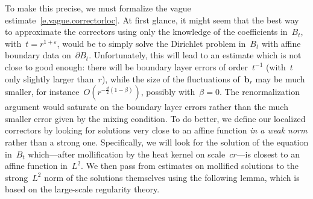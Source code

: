\documentclass[11pt,twoside]{article} %
\numberwithin{equation}{section}
\theoremstyle{definition}
\newcommand{\eps}{\varepsilon}
\renewcommand{\b}{\ensuremath{\mathbf{b}}}
\newcommand{\ep}{\eps}
\begin{document}
\smallskip

To make this precise, we must formalize the vague estimate~\eqref{e.vague.correctorloc}.
At first glance, it might seem that the best way to approximate the correctors using only the knowledge of the coefficients in~$B_t$, with~$t = r^{1+\ep}$, would be to simply solve the Dirichlet problem in~$B_t$ with affine boundary data on~$\partial B_t$. Unfortunately, this will lead to an estimate which is not close to good enough: there will be boundary layer errors of order~$t^{-1}$ (with~$t$ only slightly larger than~$r$), while the size of the fluctuations of~$\b_r$ may be much smaller, for instance~$O(r^{-\frac d2(1-\beta)})$, possibly with~$\beta=0$. The renormalization argument would saturate on the boundary layer errors rather than the much smaller error given by the mixing condition. To do better, we define our localized correctors by looking for solutions very close to an affine function \emph{in a weak norm} rather than a strong one. 
Specifically, we will look for the solution of the equation in~$B_t$ which---after mollification by the heat kernel on scale~$cr$---is closest to an affine function in~$L^2$. We then pass from estimates on mollified solutions to the strong~$L^2$ norm of the solutions themselves using the following lemma, which is based on the large-scale regularity theory. 
\end{document}
